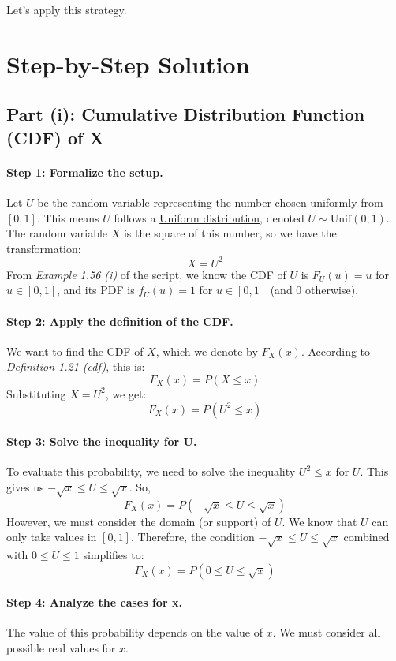 \documentclass[11pt,a4paper]{article}
\newcommand{\conceptlink}[2]{\hyperlink{#1}{#2}}
\begin{document}
Let's apply this strategy.

\section{Step-by-Step Solution}

\subsection{Part (i): Cumulative Distribution Function (CDF) of X}

\paragraph{Step 1: Formalize the setup.}
Let $U$ be the random variable representing the number chosen uniformly from $[0, 1]$. This means $U$ follows a \conceptlink{concept:unif}{Uniform distribution}, denoted $U \sim \text{Unif}(0, 1)$. The random variable $X$ is the square of this number, so we have the transformation:
\[ X = U^2 \]
From \textit{Example 1.56 (i)} of the script, we know the CDF of $U$ is $F_U(u) = u$ for $u \in [0, 1]$, and its PDF is $f_U(u) = 1$ for $u \in [0, 1]$ (and 0 otherwise).

\paragraph{Step 2: Apply the definition of the CDF.}
We want to find the CDF of $X$, which we denote by $F_X(x)$. According to \textit{Definition 1.21 (cdf)}, this is:
\[ F_X(x) = P(X \leq x) \]
Substituting $X = U^2$, we get:
\[ F_X(x) = P(U^2 \leq x) \]

\paragraph{Step 3: Solve the inequality for U.}
To evaluate this probability, we need to solve the inequality $U^2 \leq x$ for $U$. This gives us $-\sqrt{x} \leq U \leq \sqrt{x}$. So,
\[ F_X(x) = P(-\sqrt{x} \leq U \leq \sqrt{x}) \]
However, we must consider the domain (or support) of $U$. We know that $U$ can only take values in $[0, 1]$. Therefore, the condition $-\sqrt{x} \leq U \leq \sqrt{x}$ combined with $0 \leq U \leq 1$ simplifies to:
\[ F_X(x) = P(0 \leq U \leq \sqrt{x}) \]

\paragraph{Step 4: Analyze the cases for x.}
The value of this probability depends on the value of $x$. We must consider all possible real values for $x$.
\end{document}
